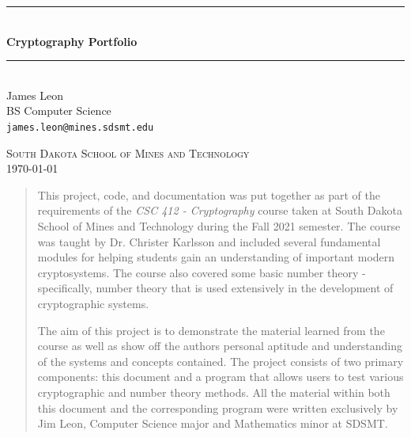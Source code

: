 \documentclass[12pt,a4paper]{article}
\newcommand{\HRule}{\rule{\linewidth}{0.5mm}}
\begin{document}
\begin{titlepage}
\begin{center}

\HRule \\[0.4cm]
{ \LARGE 
  \textbf{Cryptography Portfolio}\\[0.4cm]
}
\HRule \\[1.5cm]

{ \large
  James Leon \\[0.1cm]
  BS Computer Science\\[0.1cm]
  \texttt{james.leon@mines.sdsmt.edu}
}
\vfill

\textsc{\large South Dakota School of Mines and Technology}\\[0.4cm]
{\large \today}
 
\end{center}
\end{titlepage}


\begin{abstract}
This project, code, and documentation was put together as part of the 
requirements of the \textit{CSC 412 - Cryptography} course taken at South 
Dakota School of Mines and Technology during the Fall 2021 semester.  
The course was taught by Dr. Christer Karlsson and included several 
fundamental modules for helping students gain an understanding of important 
modern cryptosystems.  The course also covered some basic number 
theory - specifically, number theory that is used extensively in the 
development of cryptographic systems.


The aim of this project is to demonstrate the material 
learned from the course as well as show off the authors personal aptitude and 
understanding of the systems and concepts contained.  The project consists of 
two primary components:  
this document and a program that allows users to test various cryptographic 
and number theory methods.  All the material within both this document and 
the corresponding program were written exclusively by Jim Leon, Computer 
Science major and Mathematics minor at SDSMT.
\end{abstract}
\end{document}
